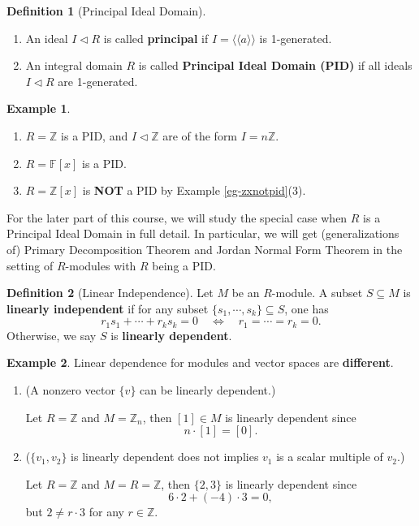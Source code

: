 \documentclass[11pt,openany]{book}
\theoremstyle{plain}
\theoremstyle{definition}
\newtheorem{definition}[definition]{Definition}
\newtheorem{example}[example]{Example}
\theoremstyle{remark}
\begin{document}
\begin{definition}[Principal Ideal Domain]\
    \begin{enumerate}
        \item An ideal $I \lhd R$ is called {\bf principal} if $I=\langle \langle a \rangle \rangle$ is 1-generated.
        \item An integral domain $R$ is called {\bf Principal Ideal Domain (PID)} if all ideals $I \lhd R$ are 1-generated.
    \end{enumerate}
\end{definition}

\begin{example}
    \begin{enumerate}
        \item $R=\mathbb{Z}$ is a PID, and $I\lhd \mathbb{Z}$ are of the form $I=n\mathbb{Z}$.
        \item $R=\mathbb{F}[x]$ is a PID.
        \item $R=\mathbb{Z}[x]$ is {\bf NOT} a PID by Example \ref{eg-zxnotpid}(3).
    \end{enumerate}
\end{example}

For the later part of this course, we will study the special case when $R$ is a Principal Ideal Domain in full detail. In particular, we will get (generalizations of) Primary Decomposition Theorem and Jordan Normal Form Theorem in the setting of $R$-modules with $R$ being a PID.

\begin{definition}[Linear Independence]
    Let $M$ be an $R$-module. A subset $S\subseteq M$ is {\bf linearly independent} if for any subset $\{s_1,\cdots,s_k\}\subseteq S$, one has
    $$r_1s_1+\cdots+r_ks_k=0\quad\Leftrightarrow\quad r_1=\cdots=r_k=0.$$
    Otherwise, we say $S$ is {\bf linearly dependent}.
\end{definition}

\begin{example} \label{eg-ld}
    Linear dependence for modules and vector spaces are {\bf different}.
    \begin{enumerate}
        \item (A nonzero vector $\{v\}$ can be linearly dependent.)

        Let $R=\mathbb{Z}$ and $M=\mathbb{Z}_{n}$, then $[1]\in M$ is linearly dependent since $$n\cdot[1]=[0].$$
        \item ($\{v_1,v_2\}$ is linearly dependent does not implies $v_1$ is a scalar multiple of $v_2$.)

        Let $R=\mathbb{Z}$ and $M=R=\mathbb{Z}$, then $\{2,3\}$ is linearly dependent since
        $$6\cdot 2+(-4)\cdot 3=0,$$
        but $2\neq r\cdot 3$ for any $r \in \mathbb{Z}$.
    \end{enumerate}
\end{example}
\end{document}
